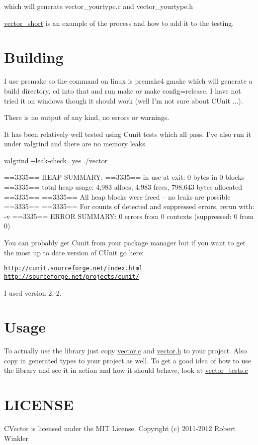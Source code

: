 which will generate vector\-\_\-yourtype.\-c and vector\-\_\-yourtype.\-h

\hyperlink{structvector__short}{vector\-\_\-short} is an example of the process and how to add it to the testing.\hypertarget{index_Building}{}\section{\-Building}\label{index_Building}
\-I use premake so the command on linux is premake4 gmake which will generate a build directory. cd into that and run make or make config=release. \-I have not tried it on windows though it should work (well \-I'm not sure about \-C\-Unit ...).

\-There is no output of any kind, no errors or warnings.

\-It has been relatively well tested using \-Cunit tests which all pass. \-I've also run it under valgrind and there are no memory leaks.

valgrind -\/-\/leak-\/check=yes ./vector


\begin{DoxyPre}
==3335== HEAP SUMMARY:
==3335==     in use at exit: 0 bytes in 0 blocks
==3335==   total heap usage: 4,983 allocs, 4,983 frees, 798,643 bytes allocated
==3335== 
==3335== All heap blocks were freed -- no leaks are possible
==3335== 
==3335== For counts of detected and suppressed errors, rerun with: -v
==3335== ERROR SUMMARY: 0 errors from 0 contexts (suppressed: 0 from 0)
\end{DoxyPre}


\-You can probably get \-Cunit from your package manager but if you want to get the most up to date version of \-C\-Unit go here\-:

\href{http://cunit.sourceforge.net/index.html}{\tt http\-://cunit.\-sourceforge.\-net/index.\-html} \href{http://sourceforge.net/projects/cunit/}{\tt http\-://sourceforge.\-net/projects/cunit/}

\-I used version 2.-\/2.\hypertarget{index_Usage}{}\section{\-Usage}\label{index_Usage}
\-To actually use the library just copy \hyperlink{vector_8c}{vector.\-c} and \hyperlink{vector_8h}{vector.\-h} to your project. \-Also copy in generated types to your project as well. \-To get a good idea of how to use the library and see it in action and how it should behave, look at \hyperlink{vector__tests_8c}{vector\-\_\-tests.\-c}\hypertarget{index_LICENSE}{}\section{\-L\-I\-C\-E\-N\-S\-E}\label{index_LICENSE}
\-C\-Vector is licensed under the \-M\-I\-T \-License. \-Copyright (c) 2011-\/2012 \-Robert \-Winkler

